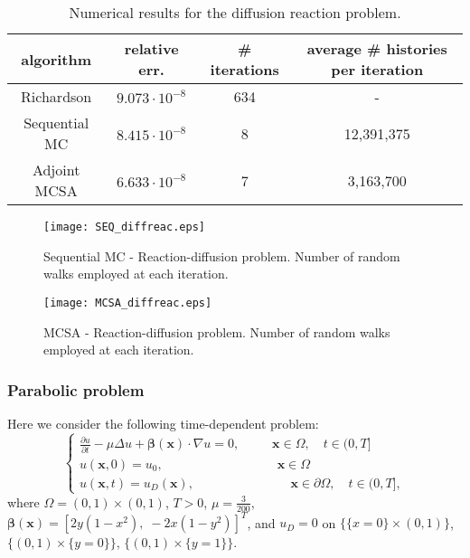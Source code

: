 \documentclass[final,leqno,onefignum,onetabnum]{siamltex1213}
\begin{document}
\begin{table}[!t]
\centering
\hspace*{-0.8cm}
\begin{tabular}{|c|c|c|c|}
\hline
algorithm & relative err.& \# iterations & average \# histories per iteration\\
\hline
 Richardson & $9.073\cdot 10^{-8}$ & 634 & - \\
\hline
 Sequential MC & $8.415 \cdot 10^{-8}$ &  8 & 12,391,375\\
 \hline
 Adjoint MCSA & $6.633 \cdot 10^{-8}$ &  7 & 3,163,700\\
\hline
\end{tabular}
\caption{Numerical results for the diffusion reaction problem.}
\label{DR_results}
\end{table}

\begin{figure}
  \centering
    \texttt{[image: SEQ\_diffreac.eps]}
      \caption{Sequential MC - Reaction-diffusion problem. Number of random
walks
employed at each
 iteration.}
\label{SEQ_diffreac}
\end{figure}


\begin{figure}
  \centering
    \texttt{[image: MCSA\_diffreac.eps]}
      \caption{MCSA - Reaction-diffusion problem. Number of random walks
employed at each
iteration.}
\label{MCSA_diffreac}
\end{figure}

\subsubsection{Parabolic problem}

Here we consider the 
following time-dependent problem:
\begin{equation}
 \begin{cases}\frac{\partial u}{\partial t} -\mu \Delta u
+\boldsymbol{\beta}(\mathbf{x})\cdot \nabla u=0, \;\; \quad \quad
\mathbf{x}\in \Omega,\quad t\in(0,T] \\
u(\mathbf{x},0) = u_0, \qquad \qquad \qquad \qquad \quad \mathbf{x}\in
\Omega \\
u(\mathbf{x},t)=u_D(\mathbf{x}),  \; \, \, \qquad \qquad \qquad \quad
\mathbf{x}\in \partial
\Omega, \quad t\in(0,T],
 \end{cases}
\end{equation}
where $\Omega = (0,1)\times (0,1)$, $T>0$,
$\mu=\frac{3}{200}$, $\boldsymbol{\beta}(\mathbf{x})=[2y(1-x^2),\;
-2x(1-y^2)]^T$, and $u_D=0$ on $\{\{x=0\}\times (0,1)\}$, $\{(0,1)\times
\{y=0\}\}$, $\{(0,1)\times \{y=1\}\}$.\newline
\end{document}
